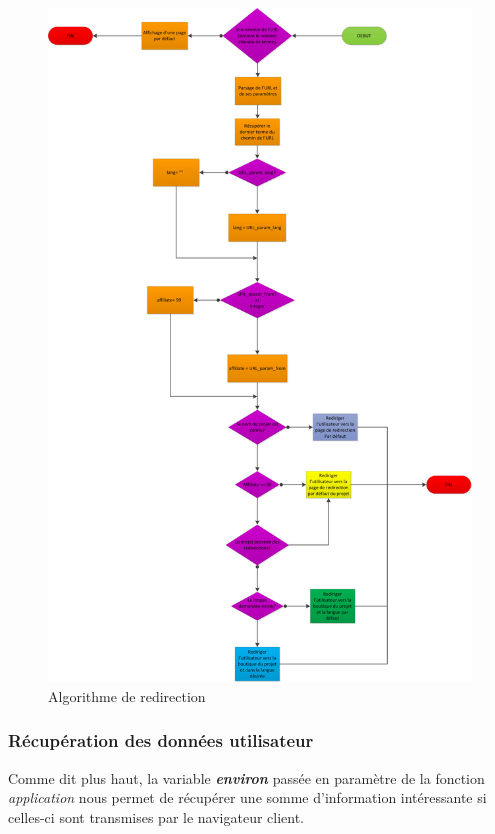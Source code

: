 \begin{figure}[h!]
	\centering
	\includegraphics[scale=0.6]{images/redirection.png}
	\caption{Algorithme de redirection }
\end{figure}

\newpage

\subsubsection*{Récupération des données utilisateur}

Comme dit plus haut, la variable \textit{\textbf{environ}} passée en paramètre de la fonction \textit{application} nous permet de récupérer une somme d'information intéressante si celles-ci sont transmises par le navigateur client.

